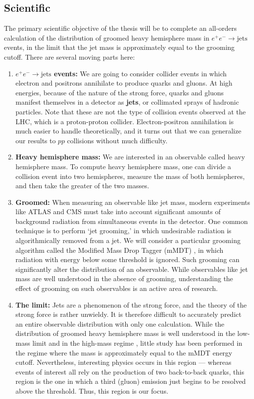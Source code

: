 \documentclass[12pt,twoside,class=../reedthesis, crop=false]{standalone}
\begin{document}
\subsection{Scientific}
	The primary scientific objective of the thesis will be to complete an all-orders calculation of the distribution of groomed heavy hemisphere mass in $e^+ e^- \to \text{jets}$ events, in the limit that the jet mass is approximately equal to the grooming cutoff. There are several moving parts here:
	\begin{enumerate}
		\item \textbf{$e^+ e^- \to \text{jets}$ events:} We are going to consider collider events in which electron and positrons annihilate to produce quarks and gluons. At high energies, because of the nature of the strong force, quarks and gluons manifest themselves in a detector as \textbf{jets}, or collimated sprays of hadronic particles. Note that these are not the type of collision events observed at the LHC, which is a proton-proton collider. Electron-positron annihilation is much easier to handle theoretically, and it turns out that we can generalize our results to $pp$ collisions without much difficulty.

		\item \textbf{Heavy hemisphere mass:} We are interested in an observable called heavy hemisphere mass. To compute heavy hemisphere mass, one can divide a collision event into two hemispheres, measure the mass of both hemispheres, and then take the greater of the two masses.

		\item \textbf{Groomed:} When measuring an observable like jet mass, modern experiments like ATLAS and CMS must take into account significant amounts of background radiation from simultaneous events in the detector. One common technique is to perform `jet grooming,' in which undesirable radiation is algorithmically removed from a jet. We will consider a particular grooming algorithm called the Modified Mass Drop Tagger (mMDT) \cite{dasgupta_towards_2013}, in which radiation with energy below some threshold is ignored. Such grooming can significantly alter the distribution of an observable. While observables like jet mass are well understood in the absence of grooming, understanding the effect of grooming on such observables is an active area of research.

		\item \textbf{The limit:} Jets are a phenomenon of the strong force, and the theory of the strong force is rather unwieldy. It is therefore difficult to accurately predict an entire observable distribution with only one calculation. While the distribution of groomed heavy hemisphere mass is well understood in the low-mass limit \cite{kardos_groomed_2020,kardos_two-_2020,frye_factorization_2016} and in the high-mass regime \cite{kardos_soft-drop_2018}, little study has been performed in the regime where the mass is approximately equal to the mMDT energy cutoff. Nevertheless, interesting physics occurs in this region --- whereas events of interest all rely on the production of two back-to-back quarks, this region is the one in which a third (gluon) emission just begins to be resolved above the threshold. Thus, this region is our focus.


\end{enumerate}
\end{document}
